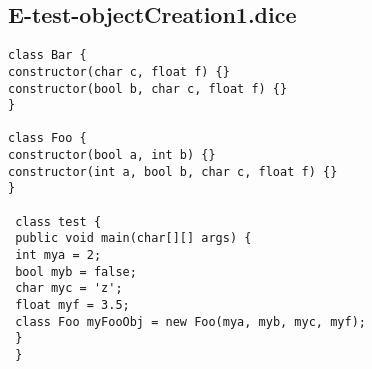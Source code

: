 \subsection{E-test-objectCreation1.dice}
\begin{verbatim}
class Bar {
constructor(char c, float f) {}
constructor(bool b, char c, float f) {}
}

class Foo {
constructor(bool a, int b) {}
constructor(int a, bool b, char c, float f) {}
}

 class test {
 public void main(char[][] args) {
 int mya = 2;
 bool myb = false;
 char myc = 'z';
 float myf = 3.5;
 class Foo myFooObj = new Foo(mya, myb, myc, myf);
 }
 }
\end{verbatim}